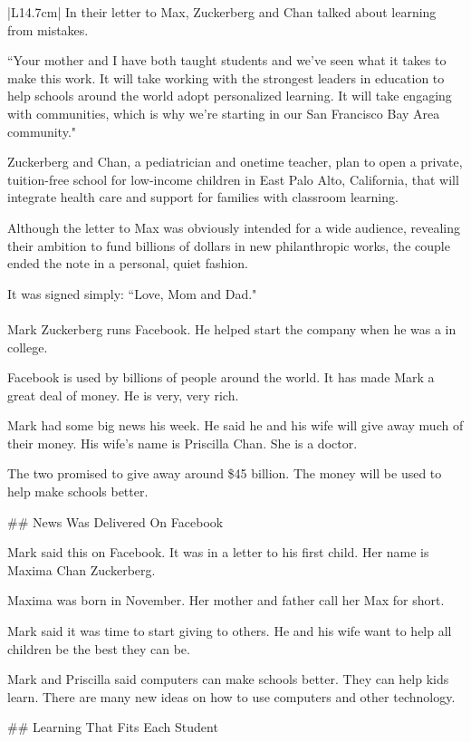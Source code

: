 \begin{table}
\begin{center}
\begin{tabular}{|L{14.7cm}|}
In their letter to Max, Zuckerberg and Chan talked about learning from mistakes.

``Your mother and I have both taught students and we've seen what it takes to make this work. It will take working with the strongest leaders in education to help schools around the world adopt personalized learning. It will take engaging with communities, which is why we're starting in our San Francisco Bay Area community."

Zuckerberg and Chan, a pediatrician and onetime teacher, plan to open a private, tuition-free school for low-income children in East Palo Alto, California, that will integrate health care and support for families with classroom learning.

Although the letter to Max was obviously intended for a wide audience, revealing their ambition to fund billions of dollars in new philanthropic works, the couple ended the note in a personal, quiet fashion.

It was signed simply: ``Love, Mom and Dad." \\ \hline \hline
{} \\ \hline 
\tiny Mark Zuckerberg runs Facebook. He helped start the company when he was a in college.

Facebook is used by billions of people around the world. It has made Mark a great deal of money. He is very, very rich.

Mark had some big news his week. He said he and his wife will give away much of their money. His wife's name is Priscilla Chan. She is a doctor.

The two promised to give away around \$45 billion. The money will be used to help make schools better.

\#\# News Was Delivered On Facebook

Mark said this on Facebook. It was in a letter to his first child. Her name is Maxima Chan Zuckerberg.

Maxima was born in November. Her mother and father call her Max for short.

Mark said it was time to start giving to others. He and his wife want to help all children be the best they can be.

Mark and Priscilla said computers can make schools better. They can help kids learn. There are many new ideas on how to use computers and other technology.

\#\# Learning That Fits Each Student


\end{tabular}
\end{center}
\end{table}
